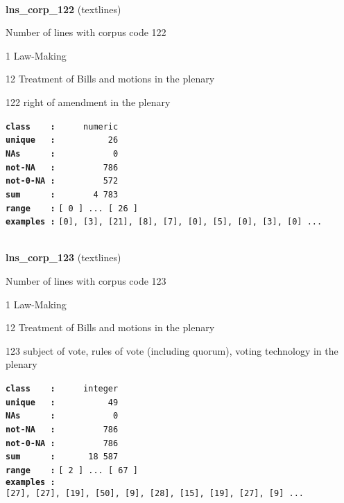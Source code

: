 \documentclass[]{article}
\begin{document}
~

\textbf{lns\_corp\_122} (textlines)

Number of lines with corpus code 122

1 Law-Making

12 Treatment of Bills and motions in the plenary

122 right of amendment in the plenary

\textbf{\texttt{class\ \ \ \ :}} \texttt{~~~~~numeric}\\
\textbf{\texttt{unique\ \ \ :}} \texttt{~~~~~~~~~~26}\\
\textbf{\texttt{NAs\ \ \ \ \ \ :}} \texttt{~~~~~~~~~~~0}\\
\textbf{\texttt{not-NA\ \ \ :}} \texttt{~~~~~~~~~786}\\
\textbf{\texttt{not-0-NA\ :}} \texttt{~~~~~~~~~572}\\
\textbf{\texttt{sum\ \ \ \ \ \ :}} \texttt{~~~~~~~4~783}\\
\textbf{\texttt{range\ \ \ \ :}}
\texttt{{[}\ 0\ {]}\ ...\ {[}\ 26\ {]}}\\
\textbf{\texttt{examples\ :}}
\texttt{{[}0{]},\ {[}3{]},\ {[}21{]},\ {[}8{]},\ {[}7{]},\ {[}0{]},\ {[}5{]},\ {[}0{]},\ {[}3{]},\ {[}0{]}\ ...}\\

~

\textbf{lns\_corp\_123} (textlines)

Number of lines with corpus code 123

1 Law-Making

12 Treatment of Bills and motions in the plenary

123 subject of vote, rules of vote (including quorum), voting technology
in the plenary

\textbf{\texttt{class\ \ \ \ :}} \texttt{~~~~~integer}\\
\textbf{\texttt{unique\ \ \ :}} \texttt{~~~~~~~~~~49}\\
\textbf{\texttt{NAs\ \ \ \ \ \ :}} \texttt{~~~~~~~~~~~0}\\
\textbf{\texttt{not-NA\ \ \ :}} \texttt{~~~~~~~~~786}\\
\textbf{\texttt{not-0-NA\ :}} \texttt{~~~~~~~~~786}\\
\textbf{\texttt{sum\ \ \ \ \ \ :}} \texttt{~~~~~~18~587}\\
\textbf{\texttt{range\ \ \ \ :}}
\texttt{{[}\ 2\ {]}\ ...\ {[}\ 67\ {]}}\\
\textbf{\texttt{examples\ :}}
\texttt{{[}27{]},\ {[}27{]},\ {[}19{]},\ {[}50{]},\ {[}9{]},\ {[}28{]},\ {[}15{]},\ {[}19{]},\ {[}27{]},\ {[}9{]}\ ...}\\
\end{document}
